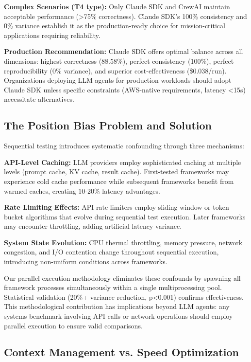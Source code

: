 \documentclass[sigconf,nonacm]{acmart}
\begin{document}
\textbf{Complex Scenarios (T4 type):} Only Claude SDK and CrewAI maintain acceptable performance (>75\% correctness). Claude SDK's 100\% consistency and 0\% variance establish it as the production-ready choice for mission-critical applications requiring reliability.

\textbf{Production Recommendation:} Claude SDK offers optimal balance across all dimensions: highest correctness (88.58\%), perfect consistency (100\%), perfect reproducibility (0\% variance), and superior cost-effectiveness (\$0.038/run). Organizations deploying LLM agents for production workloads should adopt Claude SDK unless specific constraints (AWS-native requirements, latency <15s) necessitate alternatives.

\subsection{The Position Bias Problem and Solution}

Sequential testing introduces systematic confounding through three mechanisms:

\textbf{API-Level Caching:} LLM providers employ sophisticated caching at multiple levels (prompt cache, KV cache, result cache). First-tested frameworks may experience cold cache performance while subsequent frameworks benefit from warmed caches, creating 10-20\% latency advantages.

\textbf{Rate Limiting Effects:} API rate limiters employ sliding window or token bucket algorithms that evolve during sequential test execution. Later frameworks may encounter throttling, adding artificial latency variance.

\textbf{System State Evolution:} CPU thermal throttling, memory pressure, network congestion, and I/O contention change throughout sequential execution, introducing non-uniform conditions across frameworks.

Our parallel execution methodology eliminates these confounds by spawning all framework processes simultaneously within a single multiprocessing pool. Statistical validation (20\%+ variance reduction, p<0.001) confirms effectiveness. This methodological contribution has implications beyond LLM agents: any systems benchmark involving API calls or network operations should employ parallel execution to ensure valid comparisons.

\subsection{Context Management vs. Speed Optimization}
\end{document}
